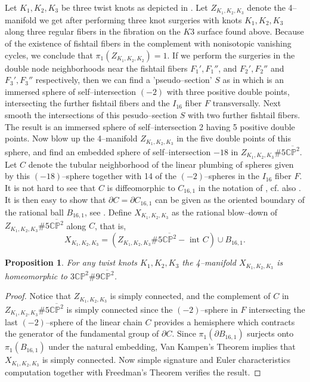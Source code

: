 \documentclass[11pt]{gtart}
\newtheorem{prop}[thm]{Proposition}
\theoremstyle{definition}
\numberwithin{equation}{section}
\newcommand{\cpkk}{{\overline {{\mathbb C}{\mathbb P}^2}}}
\newcommand{\cpk}{{\mathbb {CP}}^2}
\begin{document}
Let $K_1,K_2,K_3$ be three twist knots as depicted in \cite{FSuj}.
Let $Z_{K_1,K_2,K_3}$ denote the 4--manifold we get after performing
three knot surgeries with knots $K_1,K_2,K_3$ along three regular
fibers in the fibration on the $K3$ surface found above.  Because of
the existence of fishtail fibers in the complement with nonisotopic
vanishing cycles, we conclude that $\pi _1(Z_{K_1,K_2,K_2})=1$. If we
perform the surgeries in the double node neighborhoods near the
fishtail fibers $F_1',F_1''$, and $F_2',F_2''$ and $F_3',F_3''$
respectively, then we can find a 'pseudo--section' $S$ as in
\cite{FSuj} which is an immersed sphere of self--intersection $(-2)$
with three positive double points, intersecting the further fishtail
fibers and the $I_{16}$ fiber $F$ transversally. Next smooth the
intersections of this pesudo--section $S$ with two further fishtail
fibers. The result is an immersed sphere of self--intersection 2
having 5 positive double points. Now blow up the 4--manifold
$Z_{K_1,K_2,K_3}$ in the five double points of this sphere, and find
an embedded sphere of self--intersection $-18$ in $Z_{K_1,K_2,K_3}\# 5
\cpkk$. Let $C$ denote the tubular neighborhood of the linear plumbing
of spheres given by this $(-18)$--sphere together with 14 of the
$(-2)$--spheres in the $I_{16}$ fiber $F$. It is not hard to see that
$C$ is diffeomorphic to $C_{16,1}$ in the notation of \cite{SS},
cf. also \cite{FS1, Pratb}.  It is then easy to show that $\partial
C=\partial C_{16,1}$ can be given as the oriented boundary of the
rational ball $B_{16,1}$, see \cite{CH, FS1, SS}.  Define
$X_{K_1,K_2,K_3}$ as the rational blow--down of $Z_{K_1,K_2,K_3}\# 5
\cpkk$ along $C$, that is,
\[
X_{K_1,K_2,K_3}=(Z_{K_1,K_2,K_3}\# 5\cpkk -{\mbox { int }}C)\cup B_{16,1}.
\]


\begin{prop}\label{p:hom}
For any twist knots $K_1,K_2,K_3$ the 4--manifold $X_{K_1,K_2,K_3}$ is
homeomorphic to $3\cpk \# 9 \cpkk$.
\end{prop}
\begin{proof}
Notice that $Z_{K_1,K_2,K_3}$ is simply connected, and the complement
of $C$ in $Z_{K_1,K_2,K_3} \# 5 \cpkk$ is simply connected since the
$(-2)$--sphere in $F$ intersecting the last $(-2)$--sphere of the
linear chain $C$ provides a hemisphere which contracts the generator
of the fundamental group of $\partial C$.  Since $\pi _1 (\partial
B_{16,1})$ surjects onto $\pi _1 (B_{16,1})$ under the natural
embedding, Van Kampen's Theorem implies that $X_{K_1,K_2,K_3}$ is
simply connected. Now simple signature and Euler characteristics
computation together with Freedman's Theorem \cite{Fr} verifies the
result.
\end{proof}
\end{document}
